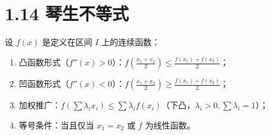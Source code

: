 \documentclass{article}
\begin{document}
\section*{1.14 琴生不等式}
设 \( f(x) \) 是定义在区间 \( I \) 上的连续函数：
\begin{enumerate}
    \item 凸函数形式（\( f''(x)>0 \)）：\( f\!\left(\frac{x_1+x_2}{2}\right) \leq \frac{f(x_1)+f(x_2)}{2} \)；
    \item 凹函数形式（\( f''(x)<0 \)）：\( f\!\left(\frac{x_1+x_2}{2}\right) \geq \frac{f(x_1)+f(x_2)}{2} \)；
    \item 加权推广：\( f(\sum \lambda_i x_i) \leq \sum \lambda_i f(x_i) \)（下凸，\( \lambda_i>0, \sum\lambda_i=1 \)）；
    \item 等号条件：当且仅当 \( x_1=x_2 \) 或 \( f \) 为线性函数。
\end{enumerate}
\end{document}
